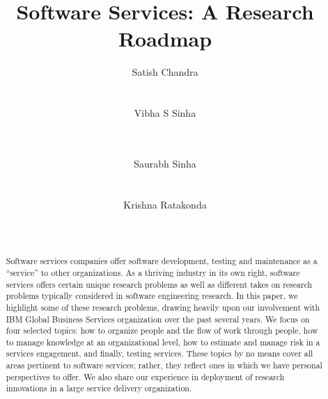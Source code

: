 \documentclass{sig-alternate}
\begin{document}

\title{Software Services: A Research Roadmap}


\author{
\alignauthor Satish Chandra\\
       \\
       \\
\alignauthor Vibha S Sinha\\
	\\
	\\
\and
\alignauthor Saurabh Sinha\\
	\\
	\\
\alignauthor Krishna Ratakonda\\
	\\
	\\
}

\maketitle

\begin{abstract}

Software services companies offer software development, testing and maintenance
as a ``service'' to other organizations.  As a thriving industry in its own
right, software services offers certain unique research problems as well as
different takes on research problems typically considered in software
engineering research. In this paper, we highlight some of these research
problems, drawing heavily upon our involvement with IBM Global Business Services
organization over the past several years.  We focus on four selected topics: how
to organize people and the flow of work through people, how to manage knowledge
at an organizational level, how to estimate and manage risk in a services
engagement, and finally, testing services. These topics by no means cover all
areas pertinent to software services; rather, they reflect ones in which we have
personal perspectives to offer.  We also share our experience in deployment of
research innovations in a large service delivery organization.

\end{abstract}
\end{document}
